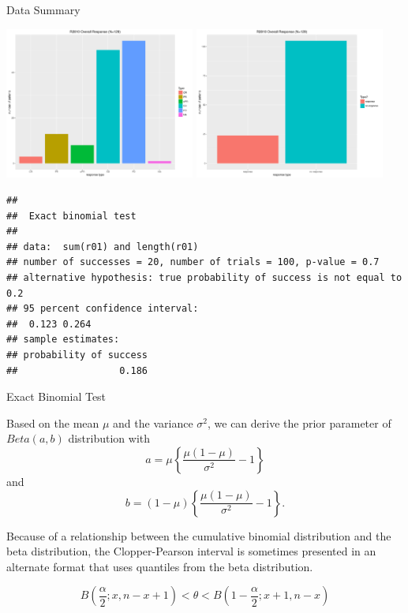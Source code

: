 \begin{frame}[fragile]{Data Summary}

\includegraphics[width=2.46in]{bayesdesign_files/figure-beamer/unnamed-chunk-9-1}
\includegraphics[width=2.46in]{bayesdesign_files/figure-beamer/unnamed-chunk-9-2}

\tiny

\begin{verbatim}
## 
##  Exact binomial test
## 
## data:  sum(r01) and length(r01)
## number of successes = 20, number of trials = 100, p-value = 0.7
## alternative hypothesis: true probability of success is not equal to 0.2
## 95 percent confidence interval:
##  0.123 0.264
## sample estimates:
## probability of success 
##                  0.186
\end{verbatim}

\end{frame}

\begin{frame}{Exact Binomial Test}

Based on the mean \(\mu\) and the variance \(\sigma^2\), we can derive
the prior parameter of \(Beta(a,b)\) distribution with
\[a=\mu\left\{\frac{\mu(1-\mu)}{\sigma^2}-1\right\}\] and
\[b=(1-\mu)\left\{\frac{\mu(1-\mu)}{\sigma^2}-1\right\}.\]

Because of a relationship between the cumulative binomial distribution
and the beta distribution, the Clopper-Pearson interval is sometimes
presented in an alternate format that uses quantiles from the beta
distribution.

\[ B\left(\frac{\alpha}{2}; x, n - x + 1\right) < \theta <  B\left(1 - \frac{\alpha}{2}; x + 1, n - x\right)\]

\end{frame}

